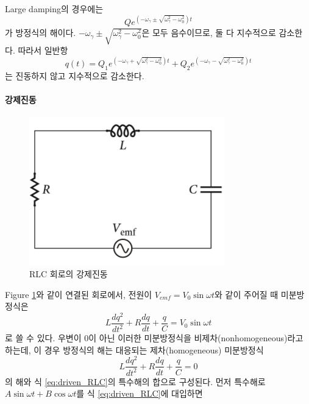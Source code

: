 \begin{enumerate}
Large damping의 경우에는 
\begin{equation}
    Qe^{(-\omega_\gamma \pm \sqrt{\omega_\gamma^2-\omega_0^2})t}
\end{equation}
가 방정식의 해이다. $-\omega_\gamma \pm \sqrt{\omega_\gamma^2-\omega_0^2}$은 모두 음수이므로, 둘 다 지수적으로 감소한다.
따라서 일반항
\begin{equation}
    q(t)=Q_1e^{(-\omega_\gamma + \sqrt{\omega_\gamma^2-\omega_0^2})t}+Q_2e^{(-\omega_\gamma - \sqrt{\omega_\gamma^2-\omega_0^2})t}
\end{equation}
는 진동하지 않고 지수적으로 감소한다.
\end{enumerate}

\paragraph{강제진동}
\begin{figure}[h]
\centering\includegraphics[scale=0.5]{Pictures/driven_RLC.PNG}
\caption{RLC 회로의 강제진동}
\label{fig:driven_RLC}
\end{figure}
Figure \ref{fig:driven_RLC}와 같이 연결된 회로에서, 전원이 $V_{emf}=V_0\sin\omega t$와 같이 주어질 때 미분방정식은
\begin{equation}
L\frac{dq^2}{dt^2}+R\frac{dq}{dt}+\frac{q}{C}=V_0\sin\omega t\label{eq:driven_RLC}
\end{equation}
로 쓸 수 있다. 우변이 0이 아닌 이러한 미분방정식을 비제차(nonhomogeneous)라고 하는데, 이 경우 방정식의 해는 대응되는 제차(homogeneous) 미분방정식
 \begin{equation}
L\frac{dq^2}{dt^2}+R\frac{dq}{dt}+\frac{q}{C}=0
\end{equation}
의 해와 식 \ref{eq:driven_RLC}의 특수해의 합으로 구성된다. 먼저 특수해로 $A\sin\omega t+B\cos\omega t$를 식 \ref{eq:driven_RLC}에 대입하면
